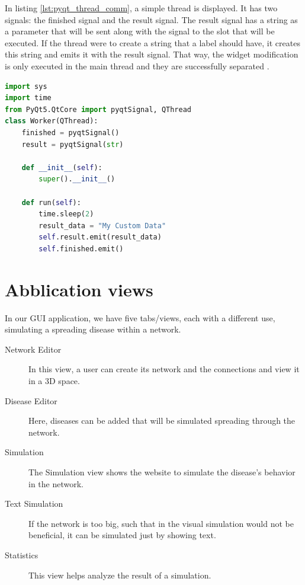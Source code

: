 In listing \ref{lst:pyqt_thread_comm}, a simple thread is displayed. It has two signals: the finished signal and the result signal. The result signal has a string as a parameter that will be sent along with the signal to the slot that will be executed. If the thread were to create a string that a label should have, it creates this string and emits it with the result signal. That way, the widget modification is only executed in the main thread and they are successfully separated \cite{pyqt}.

\begin{lstlisting}[language=python, caption={Thread example}, label={lst:pyqt_thread_comm}]
import sys
import time
from PyQt5.QtCore import pyqtSignal, QThread
class Worker(QThread):
    finished = pyqtSignal()
    result = pyqtSignal(str)

    def __init__(self):
        super().__init__()

    def run(self):
        time.sleep(2)
        result_data = "My Custom Data"
        self.result.emit(result_data)
        self.finished.emit()
\end{lstlisting}


\section{Abblication views}
\label{sub:thread_views}
In our GUI application, we have five tabs/views, each with a different use, simulating a spreading disease within a network.
\begin{description}
    \item[Network Editor] In this view, a user can create its network and the connections and view it in a 3D space.
    \item[Disease Editor] Here, diseases can be added that will be simulated spreading through the network.
    \item[Simulation] The Simulation view shows the website to simulate the disease's behavior in the network.
    \item[Text Simulation] If the network is too big, such that in the visual simulation would not be beneficial, it can be simulated just by showing text.
    \item[Statistics] This view helps analyze the result of a simulation.
\end{description}